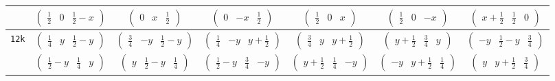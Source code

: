 \documentclass[fleqn,9pt,landscape]{jsarticle}
\begin{document}
\begin{center}
\begin{longtable}{ccccccc}
& $ \begin{pmatrix} \frac{1}{2} & 0 & \frac{1}{2} - x \end{pmatrix} $ & $ \begin{pmatrix} 0 & x & \frac{1}{2} \end{pmatrix} $ & $ \begin{pmatrix} 0 & - x & \frac{1}{2} \end{pmatrix} $ & $ \begin{pmatrix} \frac{1}{2} & 0 & x \end{pmatrix} $ & $ \begin{pmatrix} \frac{1}{2} & 0 & - x \end{pmatrix} $ & $ \begin{pmatrix} x + \frac{1}{2} & \frac{1}{2} & 0 \end{pmatrix} $ \\ \hline
{\tt 12k} & $ \begin{pmatrix} \frac{1}{4} & y & \frac{1}{2} - y \end{pmatrix} $ & $ \begin{pmatrix} \frac{3}{4} & - y & \frac{1}{2} - y \end{pmatrix} $ & $ \begin{pmatrix} \frac{1}{4} & - y & y + \frac{1}{2} \end{pmatrix} $ & $ \begin{pmatrix} \frac{3}{4} & y & y + \frac{1}{2} \end{pmatrix} $ & $ \begin{pmatrix} y + \frac{1}{2} & \frac{3}{4} & y \end{pmatrix} $ & $ \begin{pmatrix} - y & \frac{1}{2} - y & \frac{3}{4} \end{pmatrix} $ \\
& $ \begin{pmatrix} \frac{1}{2} - y & \frac{1}{4} & y \end{pmatrix} $ & $ \begin{pmatrix} y & \frac{1}{2} - y & \frac{1}{4} \end{pmatrix} $ & $ \begin{pmatrix} \frac{1}{2} - y & \frac{3}{4} & - y \end{pmatrix} $ & $ \begin{pmatrix} y + \frac{1}{2} & \frac{1}{4} & - y \end{pmatrix} $ & $ \begin{pmatrix} - y & y + \frac{1}{2} & \frac{1}{4} \end{pmatrix} $ & $ \begin{pmatrix} y & y + \frac{1}{2} & \frac{3}{4} \end{pmatrix} $ \\ \hline

\end{longtable}
\end{center}
\end{document}
